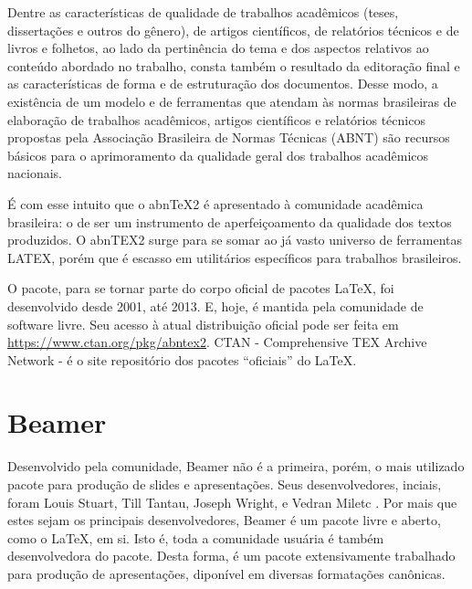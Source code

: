 \documentclass[
	12pt,				%
	openright,			%
	oneside,			%
	a4paper,			%
	english,			%
	french,				%
	spanish,			%
	brazil,				%
	]{abntex2}
\begin{document}
\begin{citacao}
Dentre as características de qualidade de trabalhos acadêmicos (teses, dissertações e
outros do gênero), de artigos científicos, de relatórios técnicos e de livros e folhetos,
ao lado da pertinência do tema e dos aspectos relativos ao conteúdo abordado no
trabalho, consta também o resultado da editoração final e as características de
forma e de estruturação dos documentos. Desse modo, a existência de um modelo
e de ferramentas que atendam às normas brasileiras de elaboração de trabalhos
acadêmicos, artigos científicos e relatórios técnicos propostas pela Associação
Brasileira de Normas Técnicas (ABNT) são recursos básicos para o aprimoramento
da qualidade geral dos trabalhos acadêmicos nacionais.

É com esse intuito que o abn\TeX2 é apresentado à comunidade acadêmica brasileira:
o de ser um instrumento de aperfeiçoamento da qualidade dos textos produzidos.
O abnTEX2 surge para se somar ao já vasto universo de ferramentas LATEX, porém
que é escasso em utilitários específicos para trabalhos brasileiros. \cite[2.1]{araujoclasse}
\end{citacao}

O pacote, para se tornar parte do corpo oficial de pacotes \LaTeX, foi
desenvolvido desde 2001, até 2013. E, hoje, é mantida pela comunidade
de software livre. Seu acesso à atual distribuição oficial pode ser
feita em \url{https://www.ctan.org/pkg/abntex2}. CTAN - Comprehensive TEX Archive Network - é o site
repositório dos pacotes ``oficiais'' do \LaTeX.

\section{Beamer}

Desenvolvido pela comunidade, Beamer não é a primeira, porém, o mais
utilizado pacote para produção de slides e apresentações. Seus
desenvolvedores, inciais, foram Louis Stuart, Till Tantau, Joseph
Wright, e Vedran Miletc \cite{tantau2010}. Por mais que estes sejam os principais
desenvolvedores, Beamer é um pacote livre e aberto, como o \LaTeX, em
si. Isto é, toda a comunidade usuária é também desenvolvedora do
pacote. Desta forma, é um pacote extensivamente trabalhado para
produção de apresentações, diponível em diversas formatações
canônicas.

\section{}
\end{document}
